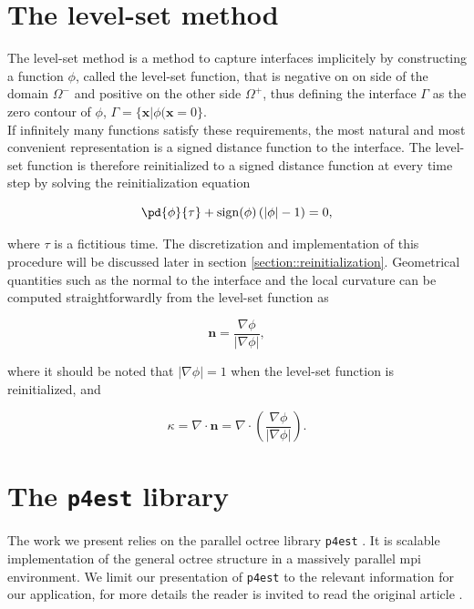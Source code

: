 \section{The level-set method}

\indent The level-set method is a method to capture interfaces implicitely by constructing a function $\phi$, called the level-set function, that is negative on on side of the domain $\Omega^-$ and positive on the other side $\Omega^+$, thus defining the interface $\Gamma$ as the zero contour of $\phi$, $\Gamma = \{\mathbf{x} \vert \phi(\mathbf{x}=0\}$.\\

If infinitely many functions satisfy these requirements, the most natural and most convenient representation is a signed distance function to the interface. The level-set function is therefore reinitialized to a signed distance function at every time step by solving the reinitialization equation

\begin{equation} \label{eq::reinitialization}
\pd{\phi}{\tau} + \mathrm{sign}(\phi) \left( \lvert \phi \rvert - 1 \right) = 0,
\end{equation}

where $\tau$ is a fictitious time. The discretization and implementation of this procedure will be discussed later in section \ref{section::reinitialization}. Geometrical quantities such as the normal to the interface and the local curvature can be computed straightforwardly from the level-set function as

\begin{equation*}
\mathbf{n} = \frac{\nabla \phi}{\lvert \nabla \phi \rvert},
\end{equation*}

where it should be noted that $\lvert \nabla \phi \rvert = 1$ when the level-set function is reinitialized, and

\begin{equation*}
\kappa = \nabla \cdot \mathbf{n} =  \nabla \cdot \left( \frac{\nabla \phi}{\lvert \nabla \phi \rvert} \right).
\end{equation*}


\section{The \texttt{p4est} library}

The work we present relies on the parallel octree library \texttt{p4est} \cite{Burstedde;Wilcox;Ghattas:11:p4est:-Scalable-Algo}. It is scalable implementation of the general octree structure in a massively parallel mpi environment. We limit our presentation of \texttt{p4est} to the relevant information for our application, for more details the reader is invited to read the original article \cite{Burstedde;Wilcox;Ghattas:11:p4est:-Scalable-Algo}.

